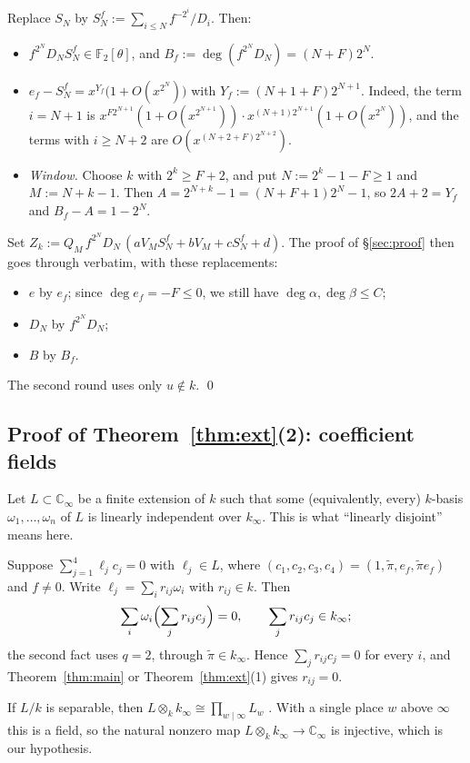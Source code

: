 \documentclass[11pt]{amsart}
\theoremstyle{remark}
\numberwithin{equation}{section}
\newcommand{\F}{\mathbb{F}}
\newcommand{\Cinf}{\mathbb{C}_\infty}
\newcommand{\kinf}{k_\infty}
\newcommand{\pit}{\tilde\pi}
\begin{document}
Replace $S_N$ by $S_N^f:=\sum_{i\le N}f^{-2^i}/D_i$. Then:
\begin{itemize}
\item $f^{2^N}D_NS_N^f\in\F_2[\theta]$, and $B_f:=\deg(f^{2^N}D_N)=(N+F)2^N$.
\item $e_f-S_N^f=x^{Y_f}\bigl(1+O(x^{2^N})\bigr)$ with $Y_f:=(N+1+F)2^{N+1}$. Indeed, the term $i=N+1$ is $x^{F2^{N+1}}(1+O(x^{2^{N+1}}))\cdot x^{(N+1)2^{N+1}}(1+O(x^{2^N}))$, and the terms with $i\ge N+2$ are $O(x^{(N+2+F)2^{N+2}})$.
\item \emph{Window.} Choose $k$ with $2^k\ge F+2$, and put $N:=2^k-1-F\ge1$ and $M:=N+k-1$. Then $A=2^{N+k}-1=(N+F+1)2^N-1$, so $2A+2=Y_f$ and $B_f-A=1-2^N$.
\end{itemize}
Set $Z_k:=Q_M\,f^{2^N}D_N\,(aV_MS_N^f+bV_M+cS_N^f+d)$. The proof of \S\ref{sec:proof} then goes through verbatim, with these replacements:
\begin{itemize}
\item $e$ by $e_f$; since $\deg e_f=-F\le0$, we still have $\deg\alpha,\deg\beta\le C$;
\item $D_N$ by $f^{2^N}D_N$;
\item $B$ by $B_f$.
\end{itemize}
The second round uses only $u\notin k$. \qed

\subsection{\texorpdfstring{Proof of Theorem~\ref{thm:ext}(2)}{Proof of Theorem 1.3(2)}: coefficient fields}
Let $L\subset\Cinf$ be a finite extension of $k$ such that some (equivalently, every) $k$-basis $\omega_1,\dots,\omega_n$ of $L$ is linearly independent over $\kinf$. This is what ``linearly disjoint'' means here.

Suppose $\sum_{j=1}^4\ell_jc_j=0$ with $\ell_j\in L$, where $(c_1,c_2,c_3,c_4)=(1,\pit,e_f,\pit e_f)$ and $f\ne0$. Write $\ell_j=\sum_ir_{ij}\omega_i$ with $r_{ij}\in k$. Then
\[
\sum_i\omega_i\Bigl(\sum_jr_{ij}c_j\Bigr)=0,\qquad \sum_jr_{ij}c_j\in\kinf ;
\]
the second fact uses $q=2$, through $\pit\in\kinf$. Hence $\sum_jr_{ij}c_j=0$ for every $i$, and Theorem~\ref{thm:main} or Theorem~\ref{thm:ext}(1) gives $r_{ij}=0$.

If $L/k$ is separable, then $L\otimes_k\kinf\cong\prod_{w\mid\infty}L_w$ \cite[Ch.~II, \S3]{Ser79}. With a single place $w$ above $\infty$ this is a field, so the natural nonzero map $L\otimes_k\kinf\to\Cinf$ is injective, which is our hypothesis.
\end{document}
